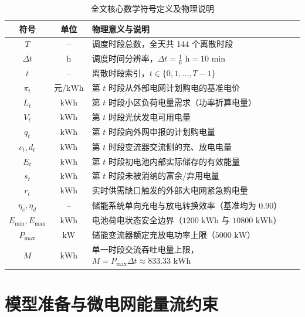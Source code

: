 \documentclass[withoutpreface]{cumcmthesis}
\begin{document}
\begin{table}[htbp]
\centering
\renewcommand{\arraystretch}{1.2}
\setlength{\tabcolsep}{6pt}
\caption{全文核心数学符号定义及物理说明}
\label{tab:notation}
\begin{tabular}{ccl}
\toprule[1.5pt]
符号 & 单位 & 物理意义与说明 \\
\midrule[1pt]
$T$          & --        & 调度时段总数，全天共 144 个离散时段 \\
$\Delta t$   & $\text{h}$ & 调度时间分辨率，$\Delta t = \frac{1}{6}\text{ h} = 10\text{ min}$ \\
$t$          & --        & 离散时段索引，$t \in \{0, 1, \dots, T-1\}$ \\
$\pi_t$      & $\text{元/kWh}$ & 第 $t$ 时段从外部电网计划购电的基准电价 \\
$L_t$        & $\text{kWh}$ & 第 $t$ 时段小区负荷电量需求（功率折算电量） \\
$V_t$        & $\text{kWh}$ & 第 $t$ 时段光伏发电可用电量 \\
$q_t$        & $\text{kWh}$ & 第 $t$ 时段向外网申报的计划购电量 \\
$c_t, d_t$   & $\text{kWh}$ & 第 $t$ 时段变流器交流侧的充、放电电量 \\
$E_t$        & $\text{kWh}$ & 第 $t$ 时段初电池内部实际储存的有效能量 \\
$s_t$        & $\text{kWh}$ & 第 $t$ 时段未被消纳的富余/弃用电量 \\
$r_t$        & $\text{kWh}$ & 实时供需缺口触发的外部大电网紧急购电量 \\
$\eta_c, \eta_d$ & --    & 储能系统单向充电与放电转换效率（基准均为 0.90） \\
$E_{\min}, E_{\max}$ & $\text{kWh}$ & 电池荷电状态安全边界（$1200\text{ kWh}$ 与 $10800\text{ kWh}$） \\
$P_{\max}$   & $\text{kW}$  & 储能变流器额定充放电功率上限（$5000\text{ kW}$） \\
$M$          & $\text{kWh}$ & 单一时段交流吞吐电量上限，$M = P_{\max}\Delta t \approx 833.33\text{ kWh}$ \\
\bottomrule[1.5pt]
\end{tabular}
\end{table}


\section{模型准备与微电网能量流约束}
\end{document}
